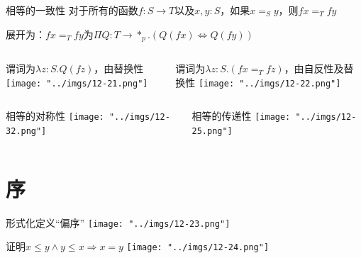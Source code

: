\documentclass[UTF8,aspectratio=169,mathserif]{beamer}
\begin{document}
		\begin{frame}[shrink]
			\begin{block}{相等的一致性}
				对于所有的函数$f:S\rightarrow T$以及$x,y:S$，如果$x=_Sy$，则$fx=_Tfy$
				
				展开为：$fx=_T fy$为$\Pi Q:T\rightarrow*_p.(Q(fx)\Leftrightarrow Q(fy))$
			\end{block}
		
			\begin{columns}
				\begin{column}{0.47\textwidth}
					\begin{block}{谓词为$\lambda z:S.Q(fz)$，由替换性}
						\texttt{[image: "../imgs/12-21.png"]}
					\end{block}
				\end{column}
				\begin{column}{0.53\textwidth}
					\begin{block}{谓词为$\lambda z:S.(fx=_T fz)$，由自反性及替换性}
						\texttt{[image: "../imgs/12-22.png"]}
					\end{block}
				\end{column}
			\end{columns}
		\end{frame}
	
		\begin{frame}[shrink]
			\begin{columns}
				\begin{column}{0.5\textwidth}
					\begin{block}{相等的对称性}
						\texttt{[image: "../imgs/12-32.png"]}
					\end{block}
				\end{column}
				\begin{column}{0.5\textwidth}
					\begin{block}{相等的传递性}
						\texttt{[image: "../imgs/12-25.png"]}
					\end{block}
				\end{column}
			\end{columns}
		\end{frame}
	
	\section{序}
		\begin{frame}{形式化定义“偏序”}
			\texttt{[image: "../imgs/12-23.png"]}
		\end{frame}
	
		\begin{frame}[shrink]{证明$x\le y\land y\le x\Rightarrow x=y$}	
			\texttt{[image: "../imgs/12-24.png"]}
		\end{frame}
\end{document}
